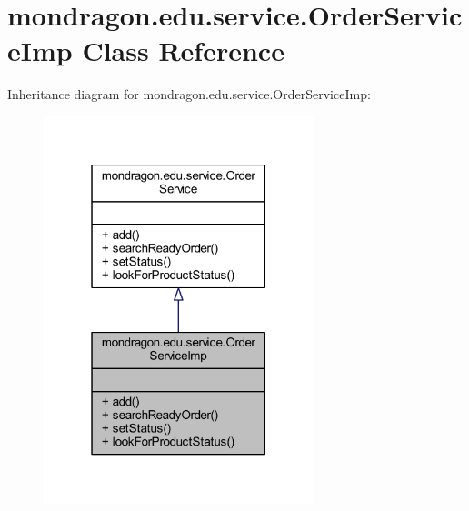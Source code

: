 \hypertarget{classmondragon_1_1edu_1_1service_1_1_order_service_imp}{}\section{mondragon.\+edu.\+service.\+Order\+Service\+Imp Class Reference}
\label{classmondragon_1_1edu_1_1service_1_1_order_service_imp}


Inheritance diagram for mondragon.\+edu.\+service.\+Order\+Service\+Imp\+:\nopagebreak
\begin{figure}[H]
\begin{center}
\leavevmode
\includegraphics[width=223pt]{classmondragon_1_1edu_1_1service_1_1_order_service_imp__inherit__graph}
\end{center}
\end{figure}


